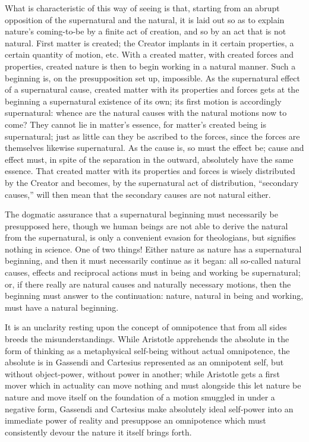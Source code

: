 \documentclass[12pt,a4paper]{book}
\begin{document}
What is characteristic of this way of seeing is that, starting from an abrupt opposition of the
supernatural and the natural, it is laid out so as to explain nature's coming-to-be by a finite act of
creation, and so by an act that is not natural. First matter is created; the Creator implants in it
certain properties, a certain quantity of motion, etc. With a created matter, with created forces and
properties, created nature is then to begin working in a natural manner. Such a beginning is, on the
presupposition set up, impossible. As the supernatural effect of a supernatural cause, created matter
with its properties and forces gets at the beginning a supernatural existence of its own; its first
motion is accordingly supernatural: whence are the natural causes with the natural motions now to
come? They cannot lie in matter's essence, for matter's created being is supernatural; just as little
can they be ascribed to the forces, since the forces are themselves likewise supernatural. As the
cause is, so must the effect be; cause and effect
must, in spite of the separation in the outward, absolutely have the same essence. That created matter
with its properties and forces is wisely distributed by the Creator and becomes, by the supernatural
act of distribution, ``secondary causes,'' will then mean that the secondary causes are not natural
either.

The dogmatic assurance that a supernatural beginning must necessarily be presupposed here, though we
human beings are not able to derive the natural from the supernatural, is only a convenient evasion for
theologians, but signifies nothing in science. One of two things! Either
nature as nature has a supernatural beginning, and then it must necessarily continue as it began: all
so-called natural causes, effects and reciprocal actions must in being and working be supernatural; or,
if there really are natural causes and naturally necessary motions, then the beginning must answer to
the continuation: nature, natural in being and working, must have a natural beginning.

It is an unclarity resting upon the concept of omnipotence that from all sides breeds the
misunderstandings. While Aristotle apprehends the absolute in the form of thinking as a metaphysical
self-being without actual omnipotence, the absolute is in Gassendi and Cartesius represented as an
omnipotent self, but without object-power, without power in another; while Aristotle gets a first mover
which in actuality can move nothing and must alongside this let nature be nature and move itself on the
foundation of a motion smuggled in under a negative form, Gassendi and Cartesius make absolutely ideal
self-power into an immediate power of reality and presuppose an omnipotence which must consistently
devour the nature it itself brings forth.
\end{document}

